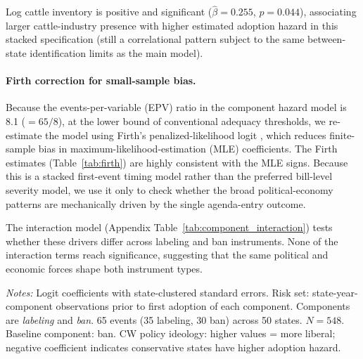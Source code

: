 \documentclass[12pt]{article}
\begin{document}
Log cattle inventory is positive and significant ($\hat{\beta} = 0.255$, $p = 0.044$), associating larger cattle-industry presence with higher estimated adoption hazard in this stacked specification (still a correlational pattern subject to the same between-state identification limits as the main model).

\paragraph{Firth correction for small-sample bias.}  Because the events-per-variable (EPV) ratio in the component hazard model is 8.1 ($= 65/8$), at the lower bound of conventional adequacy thresholds, we re-estimate the model using Firth's penalized-likelihood logit \citep{firth1993bias,heinze2002solution,king2001logistic}, which reduces finite-sample bias in maximum-likelihood-estimation (MLE) coefficients.  The Firth estimates (Table~\ref{tab:firth}) are highly consistent with the MLE signs.  Because this is a stacked first-event timing model rather than the preferred bill-level severity model, we use it only to check whether the broad political-economy patterns are mechanically driven by the single agenda-entry outcome.

The interaction model (Appendix Table~\ref{tab:component_interaction}) tests whether these drivers differ across labeling and ban instruments.  None of the interaction terms reach significance, suggesting that the same political and economic forces shape both instrument types.

\begin{table}[htbp]
\centering
\begin{threeparttable}
\caption{Pooled Component Hazard Model: Labeling and Ban Adoption}
\label{tab:component}

\begin{tablenotes}[flushleft]
\footnotesize
\item \textit{Notes:} Logit coefficients with state-clustered standard errors.  Risk set: state-year-component observations prior to first adoption of each component.  Components are \emph{labeling} and \emph{ban}.  65 events (35 labeling, 30 ban) across 50 states.  $N = 548$.  Baseline component: ban.  CW policy ideology: higher values = more liberal; negative coefficient indicates conservative states have higher adoption hazard.
\end{tablenotes}
\end{threeparttable}
\end{table}
\end{document}
